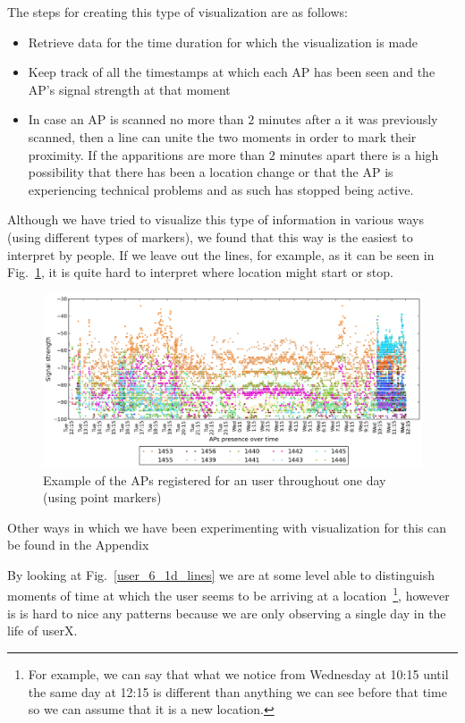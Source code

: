 The steps for creating this type of visualization are as follows:
\begin{itemize}
  \item Retrieve data for the time duration for which the visualization is made
  \item Keep track of all the timestamps at which each AP has been seen and the
  AP's signal strength at that moment
  \item In case an AP is scanned no more than $2$ minutes after a it was
  previously scanned, then a line can unite the two moments in order to mark
  their proximity. If the apparitions are more than $2$ minutes apart there is
  a high possibility that there has been a location change or that the AP is
  experiencing technical problems and as such has stopped being active.
\end{itemize}

Although we have tried to visualize this type of information in various ways
(using different types of markers), we found that this way is the easiest to
interpret by people. If we leave out the lines, for example, as it can be seen
in Fig.~\ref{user_6_1d_point}, it is quite hard to interpret where location
might start or stop.

\begin{figure}[ht]
\centering
\includegraphics[height =
0.45\textwidth]{figures/point_user_6_sorted_1days_plot.png}
\caption{Example of the APs registered for an user throughout one day (using
point markers)}
\label{user_6_1d_point}
\end{figure}

Other ways in which we have been experimenting with visualization for this can
be found in the Appendix %

By looking at Fig.~\ref{user_6_1d_lines} we are at some level able to
distinguish moments of time at which the user seems to be arriving at a
location~\footnote{For example, we can say that what we notice from Wednesday
at 10:15 until the same day at 12:15 is different than anything we can see
before that time so we can assume that it is a new location.}, however is is
hard to nice any patterns because we are only observing a single day in the life
of userX. 

